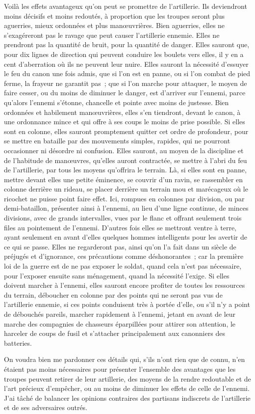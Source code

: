 \documentclass[french,twoside]{book} %
\begin{document}
Voilà les effets avantageux qu’on peut se promettre de l’artillerie. Ils deviendront moins décisifs et moins redoutés, à proportion que les troupes seront plus aguerries, mieux ordonnées et plus manœuvrières. Bien aguerries, elles ne s’exagéreront pas le ravage que peut causer l’artillerie ennemie. Elles ne prendront pas la quantité de bruit, pour la quantité de danger. Elles sauront que, pour dix lignes de direction qui peuvent conduire les boulets vers elles, il y en a cent d’aberration où ils ne peuvent leur nuire. Elles sauront la nécessité d’essuyer le feu du canon une fois admis, que si l’on est en panne, ou si l’on combat de pied ferme, la frayeur ne garantit pas ; que si l’on marche pour attaquer, le moyen de faire cesser, ou du moins de diminuer le danger, est d’arriver sur l’ennemi, parce qu’alors l’ennemi s’étonne, chancelle et pointe avec moins de justesse. Bien ordonnées et habilement manœuvrières, elles s’en tiendront, devant le canon, à une ordonnance mince et qui offre à ses coups le moins de prise possible. Si elles sont en colonne, elles sauront promptement quitter cet ordre de profondeur, pour se mettre en bataille par des mouvements simples, rapides, qui ne pourront occasionner ni désordre ni confusion. Elles sauront, au moyen de la discipline et de l’habitude de manœuvres, qu’elles auront contractée, se mettre à l’abri du feu de l’artillerie, par tous les moyens qu’offrira le terrain. Là, si elles sont en panne, mettre devant elles une petite éminence, se couvrir d’un ravin, se rassembler en colonne derrière un rideau, se placer derrière un terrain mou et marécageux où le ricochet ne puisse point faire effet. Ici, rompues en colonnes par division, ou par demi-bataillon, présenter ainsi à l’ennemi, au lieu d’une ligne continue, de minces divisions, avec de grands intervalles, vues par le flanc et offrant seulement trois files au pointement de l’ennemi. D’autres fois elles se mettront ventre à terre, ayant seulement en avant d’elles quelques hommes intelligents pour les avertir de ce qui se passe. Elles ne regarderont pas, ainsi qu’on l’a fait dans un siècle de préjugés et d’ignorance, ces précautions comme déshonorantes ; car la première loi de la guerre est de ne pas exposer le soldat, quand cela n’est pas nécessaire, pour l’exposer ensuite sans ménagement, quand la nécessité l’exige. Si elles doivent marcher à l’ennemi, elles sauront encore profiter de toutes les ressources du terrain, déboucher en colonne par des points qui ne seront pas vus de l’artillerie ennemie, si ces points conduisent très à portée d’elle, ou s’il n’y a point de débouchés pareils, marcher rapidement à l’ennemi, jetant en avant de leur marche des compagnies de chasseurs éparpillées pour attirer son attention, le harceler de coups de fusil et s’attacher principalement aux canonniers des batteries.\par
On voudra bien me pardonner ces détails qui, s’ils n’ont rien que de connu, n’en étaient pas moins nécessaires pour présenter l’ensemble des avantages que les troupes peuvent retirer de leur artillerie, des moyens de la rendre redoutable et de l’art précieux d’empêcher, ou au moins de diminuer les effets de celle de l’ennemi. J’ai tâché de balancer les opinions contraires des partisans indiscrets de l’artillerie et de ses adversaires outrés.
\end{document}
